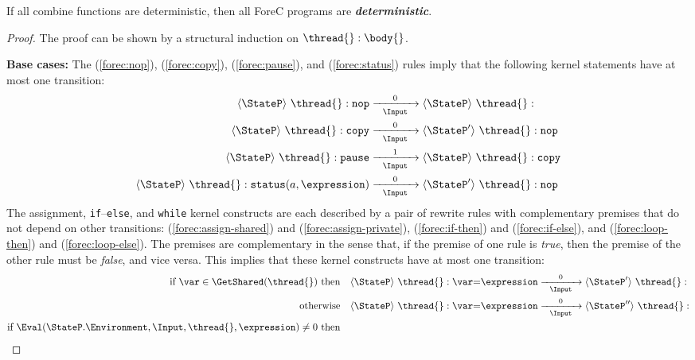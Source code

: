 \begin{theorem}
	\label{thm:deterministic}
	If all combine functions are deterministic, then
	all ForeC programs are \emph{\textbf{deterministic}}. 
\end{theorem}
\begin{proof}
	The proof can be shown by a structural induction on $\thread{}:\body{}$.
	
	\textbf{Base cases:}
	The (\ref{forec:nop}), (\ref{forec:copy}), (\ref{forec:pause}), 
	and (\ref{forec:status}) rules imply that the following kernel 
	statements have at most one transition:
	\begin{align*}
		\langle \StateP \rangle ~ \thread{}:\mathtt{nop}
		&	\xrightarrow[~~\Input~~]{0} 
		\langle \StateP \rangle ~ \thread{}:									\\
		\langle \StateP \rangle ~ \thread{}:\mathtt{copy}
		&	\xrightarrow[~~\Input~~]{0} 
		\langle \StateP' \rangle ~ \thread{}:\mathtt{nop}						\\
		\langle \StateP \rangle ~ \thread{}:\mathtt{pause}
		&	\xrightarrow[~~\Input~~]{1} 
		\langle \StateP \rangle ~ \thread{}:\mathtt{copy}						\\
		\langle \StateP \rangle ~ \thread{}:\mathtt{status}(a, \expression)
		&	\xrightarrow[~~\Input~~]{0} 
		\langle \StateP' \rangle ~ \thread{}:\mathtt{nop}
	\end{align*}
	The assignment, \verb$if$--\verb$else$, and \verb$while$ kernel constructs 
	are each described by a pair of rewrite rules with complementary premises that 
	do not depend on other transitions: (\ref{forec:assign-shared}) and 
	(\ref{forec:assign-private}), (\ref{forec:if-then}) and (\ref{forec:if-else}), 
	and (\ref{forec:loop-then}) and (\ref{forec:loop-else}).
	The premises are complementary in the sense that, if the premise of one rule is \emph{true}, 
	then the premise of the other rule must be \emph{false}, and vice versa. 
	This implies that these kernel constructs have at most one transition:
	\begin{align*}
		\text{if } \var \in \GetShared(\thread{}) \text{ then} \quad &
		\langle \StateP \rangle ~ \thread{}:\var \mathtt{=} \expression
			\xrightarrow[~~\Input~~]{0} 
		\langle \StateP' \rangle ~ \thread{}:									\\
		\text{otherwise} \quad &
		\langle \StateP \rangle ~ \thread{}:\var \mathtt{=} \expression
			\xrightarrow[~~\Input~~]{0} 
		\langle \StateP'' \rangle ~ \thread{}:									\\
		\text{if } \Eval(\StateP.\Environment, \Input, \thread{}, \expression) \neq 0 \text{ then} \quad &

\end{align*}
\end{proof}

